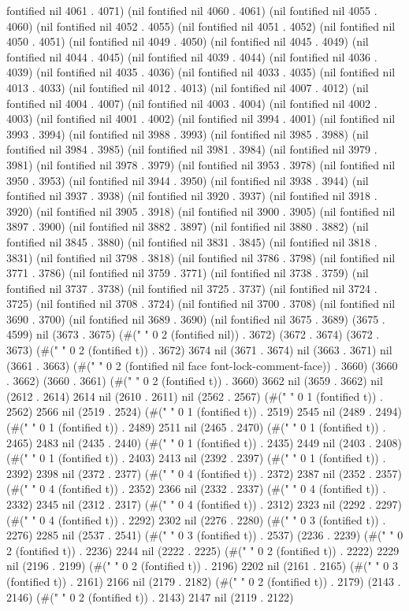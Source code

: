 fontified nil 4061 . 4071) (nil fontified nil 4060 . 4061) (nil fontified nil 4055 . 4060) (nil fontified nil 4052 . 4055) (nil fontified nil 4051 . 4052) (nil fontified nil 4050 . 4051) (nil fontified nil 4049 . 4050) (nil fontified nil 4045 . 4049) (nil fontified nil 4044 . 4045) (nil fontified nil 4039 . 4044) (nil fontified nil 4036 . 4039) (nil fontified nil 4035 . 4036) (nil fontified nil 4033 . 4035) (nil fontified nil 4013 . 4033) (nil fontified nil 4012 . 4013) (nil fontified nil 4007 . 4012) (nil fontified nil 4004 . 4007) (nil fontified nil 4003 . 4004) (nil fontified nil 4002 . 4003) (nil fontified nil 4001 . 4002) (nil fontified nil 3994 . 4001) (nil fontified nil 3993 . 3994) (nil fontified nil 3988 . 3993) (nil fontified nil 3985 . 3988) (nil fontified nil 3984 . 3985) (nil fontified nil 3981 . 3984) (nil fontified nil 3979 . 3981) (nil fontified nil 3978 . 3979) (nil fontified nil 3953 . 3978) (nil fontified nil 3950 . 3953) (nil fontified nil 3944 . 3950) (nil fontified nil 3938 . 3944) (nil fontified nil 3937 . 3938) (nil fontified nil 3920 . 3937) (nil fontified nil 3918 . 3920) (nil fontified nil 3905 . 3918) (nil fontified nil 3900 . 3905) (nil fontified nil 3897 . 3900) (nil fontified nil 3882 . 3897) (nil fontified nil 3880 . 3882) (nil fontified nil 3845 . 3880) (nil fontified nil 3831 . 3845) (nil fontified nil 3818 . 3831) (nil fontified nil 3798 . 3818) (nil fontified nil 3786 . 3798) (nil fontified nil 3771 . 3786) (nil fontified nil 3759 . 3771) (nil fontified nil 3738 . 3759) (nil fontified nil 3737 . 3738) (nil fontified nil 3725 . 3737) (nil fontified nil 3724 . 3725) (nil fontified nil 3708 . 3724) (nil fontified nil 3700 . 3708) (nil fontified nil 3690 . 3700) (nil fontified nil 3689 . 3690) (nil fontified nil 3675 . 3689) (3675 . 4599) nil (3673 . 3675) (#("  " 0 2 (fontified nil)) . 3672) (3672 . 3674) (3672 . 3673) (#("  " 0 2 (fontified t)) . 3672) 3674 nil (3671 . 3674) nil (3663 . 3671) nil (3661 . 3663) (#("  " 0 2 (fontified nil face font-lock-comment-face)) . 3660) (3660 . 3662) (3660 . 3661) (#("  " 0 2 (fontified t)) . 3660) 3662 nil (3659 . 3662) nil (2612 . 2614) 2614 nil (2610 . 2611) nil (2562 . 2567) (#(" " 0 1 (fontified t)) . 2562) 2566 nil (2519 . 2524) (#(" " 0 1 (fontified t)) . 2519) 2545 nil (2489 . 2494) (#(" " 0 1 (fontified t)) . 2489) 2511 nil (2465 . 2470) (#(" " 0 1 (fontified t)) . 2465) 2483 nil (2435 . 2440) (#(" " 0 1 (fontified t)) . 2435) 2449 nil (2403 . 2408) (#(" " 0 1 (fontified t)) . 2403) 2413 nil (2392 . 2397) (#(" " 0 1 (fontified t)) . 2392) 2398 nil (2372 . 2377) (#("    " 0 4 (fontified t)) . 2372) 2387 nil (2352 . 2357) (#("    " 0 4 (fontified t)) . 2352) 2366 nil (2332 . 2337) (#("    " 0 4 (fontified t)) . 2332) 2345 nil (2312 . 2317) (#("    " 0 4 (fontified t)) . 2312) 2323 nil (2292 . 2297) (#("    " 0 4 (fontified t)) . 2292) 2302 nil (2276 . 2280) (#("   " 0 3 (fontified t)) . 2276) 2285 nil (2537 . 2541) (#("   " 0 3 (fontified t)) . 2537) (2236 . 2239) (#("  " 0 2 (fontified t)) . 2236) 2244 nil (2222 . 2225) (#("  " 0 2 (fontified t)) . 2222) 2229 nil (2196 . 2199) (#("  " 0 2 (fontified t)) . 2196) 2202 nil (2161 . 2165) (#("   " 0 3 (fontified t)) . 2161) 2166 nil (2179 . 2182) (#("  " 0 2 (fontified t)) . 2179) (2143 . 2146) (#("  " 0 2 (fontified t)) . 2143) 2147 nil (2119 . 2122) 
